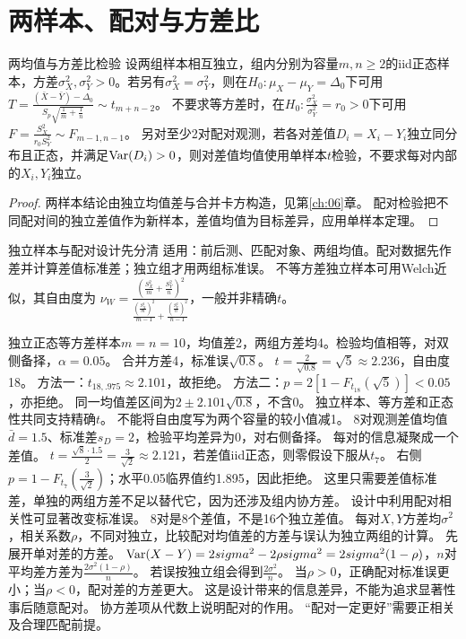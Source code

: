 \section{两样本、配对与方差比}\label{sec:83}
\begin{theorem}{两均值与方差比检验}
设两组样本相互独立，组内分别为容量$m,n\ge2$的iid正态样本，方差$\sigma_X^2,\sigma_Y^2>0$。若另有$\sigma_X^2=\sigma_Y^2$，则在$H_0:\mu_X-\mu_Y=\Delta_0$下可用
$T=\frac{(\bar X-\bar Y)-\Delta_0}{S_p\sqrt{\frac{1}{m}+\frac{1}{n}}}\sim t_{m+n-2}$。
不要求等方差时，在$H_0:\frac{\sigma_X^2}{\sigma_Y^2}=r_0>0$下可用$F=\frac{S_X^2}{r_0 S_Y^2}\sim F_{m-1,n-1}$。
另对至少2对配对观测，若各对差值$D_i=X_i-Y_i$独立同分布且正态，并满足$\operatorname{Var}(D_i)>0$，则对差值均值使用单样本$t$检验，不要求每对内部的$X_i,Y_i$独立。
\end{theorem}
\begin{proof}
两样本结论由独立均值差与合并卡方构造，见第\ref{ch:06}章。
配对检验把不同配对间的独立差值作为新样本，差值均值为目标差异，应用单样本定理。
\end{proof}
\begin{method}{独立样本与配对设计先分清}
适用：前后测、匹配对象、两组均值。配对数据先作差并计算差值标准差；独立组才用两组标准误。
不等方差独立样本可用Welch近似，其自由度为
$\nu_W=\frac{(\frac{S_X^2}{m}+\frac{S_Y^2}{n})^2}{\frac{(\frac{S_X^2}{m})^2}{m-1}+\frac{(\frac{S_Y^2}{n})^2}{n-1}}$，一般并非精确$t$。
\end{method}
{独立正态等方差样本$m=n=10$，均值差2，两组方差均4。检验均值相等，对双侧备择，$\alpha=0.05$。}
{合并方差4，标准误$\sqrt{0.8}$。}
{$t=\frac{2}{\sqrt{0.8}}=\sqrt5\approx2.236$，自由度18。
方法一：$t_{18,.975}\approx2.101$，故拒绝。
方法二：$p=2[1-F_{t_{18}}(\sqrt5)]<0.05$，亦拒绝。
同一均值差区间为$2\pm2.101\sqrt{0.8}$，不含0。}
{独立样本、等方差和正态性共同支持精确$t$。}
{不能将自由度写为两个容量的较小值减1。}
{8对观测差值均值$\bar d=1.5$、标准差$s_D=2$，检验平均差异为0，对右侧备择。}
{每对的信息凝聚成一个差值。}
{$t=\frac{\sqrt8\cdot1.5}{2}=\frac{3}{\sqrt2}\approx2.121$，若差值iid正态，则零假设下服从$t_7$。
右侧$p=1-F_{t_7}(\frac{3}{\sqrt2})$；水平0.05临界值约1.895，因此拒绝。
这里只需要差值标准差，单独的两组方差不足以替代它，因为还涉及组内协方差。}
{设计中利用配对相关性可显著改变标准误。}
{8对是8个差值，不是16个独立差值。}
{每对$X,Y$方差均$\sigma^2$，相关系数$\rho$，不同对独立，比较配对均值差的方差与误认为独立两组的计算。}
{先展开单对差的方差。}
{$\operatorname{Var}(X-Y)=2sigma^2-2\rho sigma^2=2sigma^2(1-\rho)$，$n$对平均差方差为$\frac{2\sigma^2(1-\rho)}{n}$。
若误按独立组会得到$\frac{2\sigma^2}{n}$。
当$\rho>0$，正确配对标准误更小；当$\rho<0$，配对差的方差更大。
这是设计带来的信息差异，不能为追求显著性事后随意配对。}
{协方差项从代数上说明配对的作用。}
{“配对一定更好”需要正相关及合理匹配前提。}


